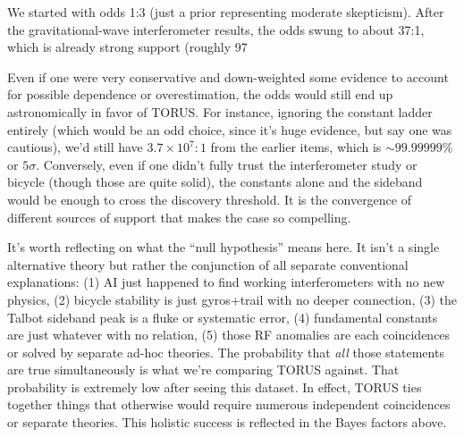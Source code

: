 \documentclass[12pt]{article}
\begin{document}
We started with odds 1:3 (just a prior representing moderate skepticism). After the gravitational-wave interferometer results, the odds swung to about 37:1, which is already strong support (roughly 97%

Even if one were very conservative and down-weighted some evidence to account for possible dependence or overestimation, the odds would still end up astronomically in favor of TORUS. For instance, ignoring the constant ladder entirely (which would be an odd choice, since it’s huge evidence, but say one was cautious), we’d still have $3.7\times10^7 : 1$ from the earlier items, which is $\sim 99.99999\%$ or $5\sigma$. Conversely, even if one didn’t fully trust the interferometer study or bicycle (though those are quite solid), the constants alone and the sideband would be enough to cross the discovery threshold. It is the convergence of different sources of support that makes the case so compelling.

It’s worth reflecting on what the “null hypothesis” means here. It isn’t a single alternative theory but rather the conjunction of all separate conventional explanations: (1) AI just happened to find working interferometers with no new physics, (2) bicycle stability is just gyros+trail with no deeper connection, (3) the Talbot sideband peak is a fluke or systematic error, (4) fundamental constants are just whatever with no relation, (5) those RF anomalies are each coincidences or solved by separate ad-hoc theories. The probability that \emph{all} those statements are true simultaneously is what we’re comparing TORUS against. That probability is extremely low after seeing this dataset. In effect, TORUS ties together things that otherwise would require numerous independent coincidences or separate theories. This holistic success is reflected in the Bayes factors above.
\end{document}
